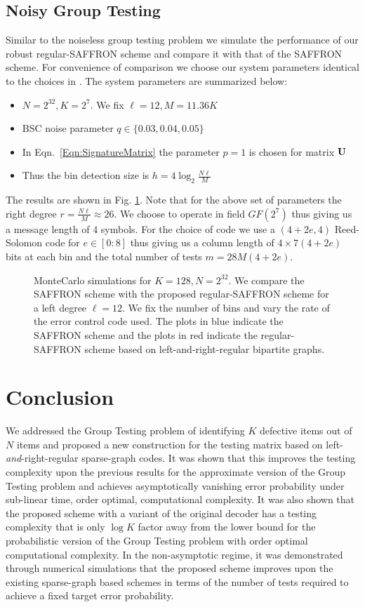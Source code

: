 \subsection*{Noisy Group Testing}
Similar to the noiseless group testing problem we simulate the performance of our robust regular-SAFFRON scheme and compare it with that of the SAFFRON scheme. For convenience of comparison we choose our system parameters identical to the choices in \cite{lee2015saffron}. The system parameters are summarized below:
\begin{itemize}
\item $N=2^{32}, K=2^7$. We fix $\ell=12, M=11.36K$ 
\item BSC noise parameter $q\in\{0.03,0.04,0.05\}$
\item In Eqn.~\ref{Eqn:SignatureMatrix} the parameter $p=1$ is chosen for matrix $\mathbf{U}$
\item Thus the bin detection size is $h=4\log_2 \frac{N\ell}{M}$
\end{itemize}
The results are shown in Fig. \ref{Fig:SimulationNoisy}. Note that for the above set of parameters the right degree $r=\frac{N\ell}{M}\approx 26$. We choose to operate in field $GF(2^7)$ thus giving us a message length of $4$ symbols. For the choice of code we use a $(4+2e,4)$ Reed-Solomon code for $e\in[0:8]$ thus giving us a column length of $4\times 7(4+2e)$ bits at each bin and the total number of tests $m=28M(4+2e)$.

\begin{figure}[t!]
\centering

\caption{MonteCarlo simulations for $K=128, N=2^{32}$. We compare the SAFFRON scheme with the proposed regular-SAFFRON scheme for a left degree $\ell=12$. We fix the number of bins and vary the rate of the error control code used. The plots in blue indicate the SAFFRON scheme\cite{lee2015saffron} and the plots in red indicate the regular-SAFFRON scheme based on left-and-right-regular bipartite graphs.}
\label{Fig:SimulationNoisy}
\end{figure}

\section{Conclusion}
We addressed the Group Testing problem of identifying $K$ defective items out of $N$ items and proposed a new construction for the testing matrix based on left-\emph{and}-right-regular sparse-graph codes. It was shown that this improves the testing complexity upon the previous results for the approximate version of the Group Testing problem and achieves asymptotically vanishing error probability under sub-linear time, order optimal, computational complexity. It was also shown that the proposed scheme with a variant of the original decoder has a testing complexity that is only $\log K$ factor away from the lower bound for the probabilistic version of the Group Testing problem with order optimal computational complexity. In the non-asymptotic regime, it was demonstrated through numerical simulations that the proposed scheme improves upon the existing sparse-graph based schemes in terms of the number of tests required to achieve a fixed target error probability.

%
%
% 
